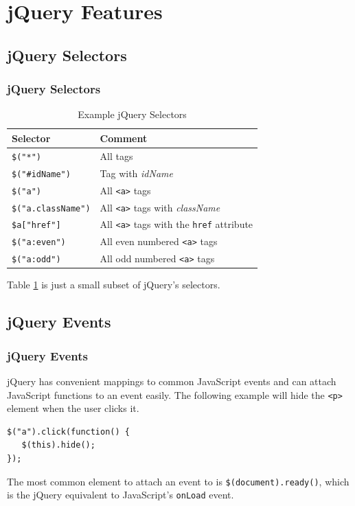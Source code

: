 \documentclass[aspectratio=169]{beamer}
\begin{document}
\section{jQuery Features}
\subsection{jQuery Selectors}
\begin{frame}
\frametitle{jQuery Selectors}
\begin{table}
\begin{tabular}{|l|l|}
\hline
\textbf{Selector} & \textbf{Comment}\\
\hline
\texttt{\$("*")} & All tags\\
\hline
\texttt{\$("\#idName")} & Tag with \textit{idName}\\
\hline
\texttt{\$("a")} & All \texttt{<a>} tags\\
\hline
\texttt{\$("a.className")} & All \texttt{<a>} tags with \textit{className}\\
\hline
\texttt{\$a["href"]} & All \texttt{<a>} tags with the \texttt{href} attribute\\
\hline
\texttt{\$("a:even")} & All even numbered \texttt{<a>} tags\\
\hline
\texttt{\$("a:odd")} & All odd numbered \texttt{<a>} tags\\
\hline
\end{tabular}
\caption{Example jQuery Selectors \cite{jquery-selectors}}
\label{tbl:selectors}
\end{table}
Table \ref{tbl:selectors} is just a small subset of jQuery's selectors.
\end{frame}

\subsection{jQuery Events}
\begin{frame}[fragile]
\frametitle{jQuery Events}
jQuery has convenient mappings to common JavaScript events and can attach JavaScript functions to an event easily. The following example will hide the \texttt{<p>} element when the user clicks it.
\begin{lstlisting}[caption=Hide the current \texttt{<a>} element]
$("a").click(function() {
   $(this).hide();
});
\end{lstlisting}
The most common element to attach an event to is \texttt{\$(document).ready()}, which is the jQuery equivalent to JavaScript's \texttt{onLoad} event. \cite{jquery-events}
\end{frame}
\end{document}
